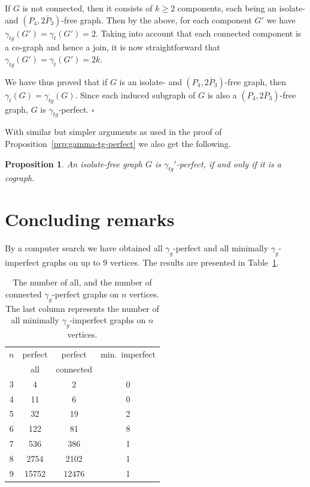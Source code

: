 \documentclass[12pt]{article}
\newtheorem{proposition}[theorem]{Proposition}
\newcommand{\qed}{\hfill $\square$ \bigskip}
\begin{document}
If $G$ is not connected, then it consists of $k\ge 2$ components, each being an isolate- and  $(P_4, \overline{2P_3})$-free graph. Then by the above, for each component $G'$ we have $\gamma_{tg}(G') = \gamma_t(G') = 2$. Taking into account that each connected component is a co-graph and hence a join, it is now straightforward that $\gamma_{tg}(G') = \gamma_t(G') = 2k$.   

We have thus proved that if $G$ is an isolate- and $(P_4, \overline{2P_3})$-free graph, then $\gamma_t(G) = \gamma_{tg}(G)$. Since each induced subgraph of $G$ is also a $(P_4, \overline{2P_3})$-free graph, $G$ is $\gamma_{tg}$-perfect. 
\qed 

With similar but simpler arguments as used in the proof of Proposition~\ref{prp:gamma-tg-perfect} we also get the following. 
 
\begin{proposition}
 	An isolate-free  graph $G$ is $\gamma_{tg}'$-perfect, if and only if it is a cograph.
 \end{proposition}

\section{Concluding remarks}
\label{sec:remarks}

By a computer search we have obtained all $\gamma_g$-perfect and all minimally $\gamma_g$-imperfect graphs on up to $9$ vertices. The results are presented in Table~\ref{tbl:perfect}.
 
 \begin{table}[h!!]
 	\begin{center}
 		\begin{tabular}{c || c | c | c}
 			$n$ & perfect & perfect &   min.\ imperfect\\
 			 & all & connected &\\ \hline \hline
 			3 & 4 & 2 & 0\\
 			4 & 11 & 6 & 0\\
 			5 & 32 & 19 & 2\\
 			6 & 122 & 81 & 8\\
 			7 & 536 & 386 & 1\\
 			8 & 2754 & 2102 & 1\\
 			9 & 15752 & 12476 & 1\\
 		\end{tabular}
 	\end{center}
 	\caption{The number of all, and the number of connected $\gamma_g$-perfect graphs on $n$ vertices. The last column represents the number of all minimally $\gamma_g$-imperfect graphs on $n$ vertices.}
 	\label{tbl:perfect}
 \end{table}
\end{document}
